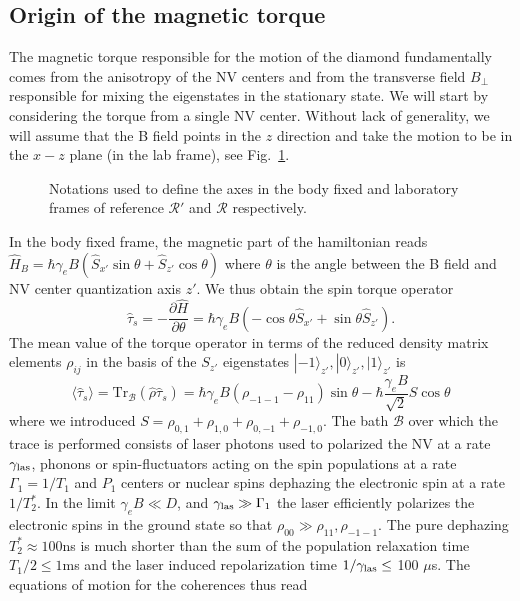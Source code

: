 \documentclass[preprintnumbers,amsmath,amssymb,onecolumn,12pt]{revtex4}
\newcommand{\be}{\begin{equation}}
\newcommand{\ee}{\end{equation}}
\begin{document}
\subsection{Origin of the magnetic torque}

The magnetic torque responsible for the motion of the diamond fundamentally comes from the anisotropy of the NV centers and from the transverse field $B_\perp$ responsible for mixing the eigenstates in the stationary state. We will start by considering the torque from a single NV center.
Without lack of generality, we will assume that the B field points in the $z$ direction and take the motion to be in the $x-z$ plane (in the lab frame), see Fig.~\ref{axes}.

\begin{figure}[ht]
  \caption{Notations used to define the axes in the body fixed and laboratory frames of reference $\mathcal{R'}$ and $\mathcal{R}$ respectively.}
  		\label{axes}
\end{figure}

In the body fixed frame, the magnetic part of the hamiltonian reads 
$\hat {H}_{B}= \hbar \gamma_e B  (\hat{S}_{x'} \sin\theta + \hat{S}_{z'} \cos\theta)$
where $\theta$ is the angle between the B field and NV center quantization axis $z'$.
We thus obtain the spin torque operator
\be
\hat \tau_s = -\frac{\partial \hat{H}}{\partial \theta} = \hbar \gamma_e B (-\cos\theta \hat{S}_{x'}+\sin\theta \hat{S}_{z'}).
\ee
The mean value of the torque operator in terms of the reduced density matrix elements $\rho_{ij}$ in the basis of the $S_{z'}$ eigenstates $|-1\rangle_{z'},|0\rangle_{z'},|1\rangle_{z'}$ is 
\be
\langle \hat \tau_s \rangle =\mathrm{Tr}_\mathcal{B}(\hat \rho \hat \tau_s) = \hbar \gamma_e B   (\rho_{-1-1}-\rho_{11})\sin\theta - \hbar \frac{\gamma_e B}{\sqrt{2}} S \cos\theta\label{torquemean}
\ee
where we introduced $S=\rho_{0,1}+\rho_{1,0}+\rho_{0,-1}+\rho_{-1,0}$.
The bath $\mathcal{B}$ over which the trace is performed consists of laser photons used to polarized the NV at a rate $\gamma_{\rm las}$, phonons or spin-fluctuators acting on the spin populations at a rate $\Gamma_1=1/T_1$ and 
$P_1$ centers or nuclear spins dephazing the electronic spin at a rate $1/T_2^*$.
In the limit $\gamma_e B \ll D$, and $\gamma_{\rm las}\gg \Gamma_1$ the laser efficiently polarizes the electronic spins in the ground state so that $\rho_{00}\gg {\rho_{11},\rho_{-1-1}}$.
The pure dephazing $T_2^*\approx 100$ns is much shorter than the sum of the population relaxation time $T_1/2 \le 1$ms and the laser induced repolarization time $1/\gamma_{\rm las} \le $ 100 $\mu$s. The equations of motion for the coherences thus read 
\end{document}
